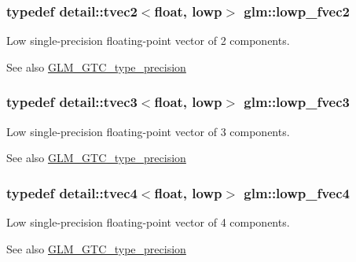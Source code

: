 \subsubsection[{\texorpdfstring{lowp\+\_\+fvec2}{lowp_fvec2}}]{\setlength{\rightskip}{0pt plus 5cm}typedef detail\+::tvec2$<$float, lowp$>$ {\bf glm\+::lowp\+\_\+fvec2}}\hypertarget{group__gtc__type__precision_gaf365442c52322b810bc0ed943e539229}{}\label{group__gtc__type__precision_gaf365442c52322b810bc0ed943e539229}
Low single-\/precision floating-\/point vector of 2 components. \begin{DoxySeeAlso}{See also}
\hyperlink{group__gtc__type__precision}{G\+L\+M\+\_\+\+G\+T\+C\+\_\+type\+\_\+precision} 
\end{DoxySeeAlso}
\subsubsection[{\texorpdfstring{lowp\+\_\+fvec3}{lowp_fvec3}}]{\setlength{\rightskip}{0pt plus 5cm}typedef detail\+::tvec3$<$float, lowp$>$ {\bf glm\+::lowp\+\_\+fvec3}}\hypertarget{group__gtc__type__precision_ga83d77dfe136d4add9e214cd205320c12}{}\label{group__gtc__type__precision_ga83d77dfe136d4add9e214cd205320c12}
Low single-\/precision floating-\/point vector of 3 components. \begin{DoxySeeAlso}{See also}
\hyperlink{group__gtc__type__precision}{G\+L\+M\+\_\+\+G\+T\+C\+\_\+type\+\_\+precision} 
\end{DoxySeeAlso}
\subsubsection[{\texorpdfstring{lowp\+\_\+fvec4}{lowp_fvec4}}]{\setlength{\rightskip}{0pt plus 5cm}typedef detail\+::tvec4$<$float, lowp$>$ {\bf glm\+::lowp\+\_\+fvec4}}\hypertarget{group__gtc__type__precision_ga0d016cdbff067c450122115d0620bf85}{}\label{group__gtc__type__precision_ga0d016cdbff067c450122115d0620bf85}
Low single-\/precision floating-\/point vector of 4 components. \begin{DoxySeeAlso}{See also}
\hyperlink{group__gtc__type__precision}{G\+L\+M\+\_\+\+G\+T\+C\+\_\+type\+\_\+precision} 
\end{DoxySeeAlso}
